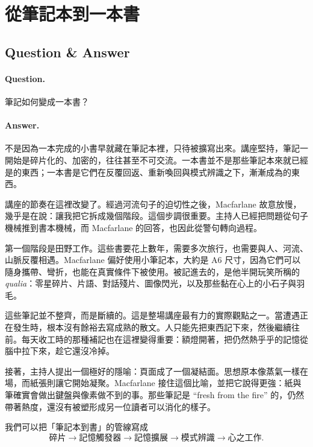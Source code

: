 \section{從筆記本到一本書}

\subsection{Question \& Answer}

\paragraph{Question.} 筆記如何變成一本書？

\paragraph{Answer.} 不是因為一本完成的小書早就藏在筆記本裡，只待被擴寫出來。講座堅持，筆記一開始是碎片化的、加密的，往往甚至不可交流。一本書並不是那些筆記本來就已經是的東西；一本書是它們在反覆回返、重新喚回與模式辨識之下，漸漸成為的東西。

講座的節奏在這裡改變了。經過河流句子的迫切性之後，Macfarlane 故意放慢，幾乎是在說：讓我把它拆成幾個階段。這個步調很重要。主持人已經把問題從句子機械推到書本機械，而 Macfarlane 的回答，也因此從警句轉向過程。

第一個階段是田野工作。這些書要花上數年，需要多次旅行，也需要與人、河流、山脈反覆相遇。Macfarlane 偏好使用小筆記本，大約是 A6 尺寸，因為它們可以隨身攜帶、彎折，也能在真實條件下被使用。被記進去的，是他半開玩笑所稱的 \emph{qualia}：零星碎片、片語、對話殘片、圖像閃光，以及那些黏在心上的小石子與羽毛。

這些筆記並不整齊，而是斷續的。這是整場講座最有力的實際觀點之一。當遭遇正在發生時，根本沒有餘裕去寫成熟的散文。人只能先把東西記下來，然後繼續往前。每天收工時的那種補記也在這裡變得重要：額燈開著，把仍然熱乎乎的記憶從腦中拉下來，趁它還沒冷掉。

接著，主持人提出一個極好的隱喻：頁面成了一個凝結面。思想原本像蒸氣一樣在場，而紙張則讓它開始凝聚。Macfarlane 接住這個比喻，並把它說得更強：紙與筆確實會做出鍵盤與像素做不到的事。那些筆記是 ``fresh from the fire'' 的，仍然帶著熱度，還沒有被塑形成另一位讀者可以消化的樣子。

我們可以把「筆記本到書」的管線寫成
\begin{equation}
\text{碎片} \longrightarrow \text{記憶觸發器} \longrightarrow \text{記憶擴展} \longrightarrow \text{模式辨識} \longrightarrow \text{心之工作}.
\end{equation}

